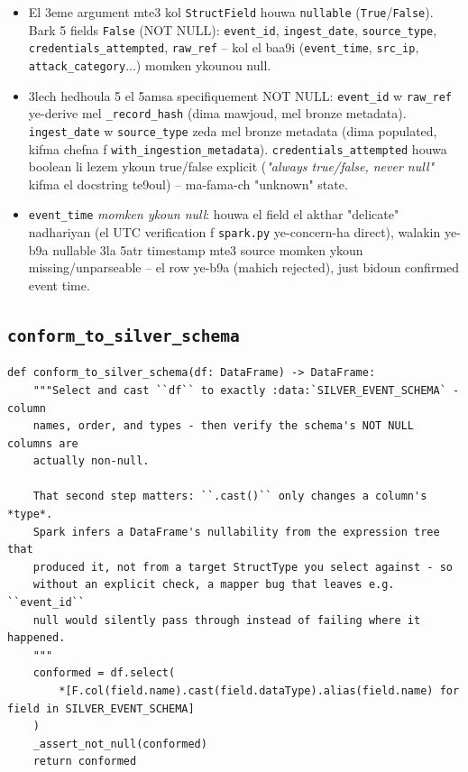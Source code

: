 \documentclass[11pt,a4paper]{report}
\DeclareRobustCommand{\code}[1]{\texttt{#1}}
\begin{document}
\begin{itemize}
  \item El 3eme argument mte3 kol \code{StructField} houwa \code{nullable}
        (\code{True}/\code{False}). Bark 5 fields \code{False} (NOT NULL):
        \code{event\_id}, \code{ingest\_date}, \code{source\_type},
        \code{credentials\_attempted}, \code{raw\_ref} -- kol el baa9i
        (\code{event\_time}, \code{src\_ip}, \code{attack\_category}...)
        momken ykounou null.
  \item 3lech hedhoula 5 el 5amsa specifiquement NOT NULL: \code{event\_id}
        w \code{raw\_ref} ye-derive mel \code{\_record\_hash} (dima mawjoud,
        mel bronze metadata). \code{ingest\_date} w \code{source\_type}
        zeda mel bronze metadata (dima populated, kifma chefna f
        \code{with\_ingestion\_metadata}). \code{credentials\_attempted}
        houwa boolean li lezem ykoun true/false explicit (\emph{"always
        true/false, never null"} kifma el docstring te9oul) -- ma-fama-ch
        "unknown" state.
  \item \code{event\_time} \emph{momken ykoun null}: houwa el field el
        akthar "delicate" nadhariyan (el UTC verification f \code{spark.py}
        ye-concern-ha direct), walakin ye-b9a nullable 3la 5atr timestamp
        mte3 source momken ykoun missing/unparseable -- el row ye-b9a
        (mahich rejected), just bidoun confirmed event time.
\end{itemize}

\subsection{\code{conform\_to\_silver\_schema}}

\begin{lstlisting}[style=pystyle]
def conform_to_silver_schema(df: DataFrame) -> DataFrame:
    """Select and cast ``df`` to exactly :data:`SILVER_EVENT_SCHEMA` - column
    names, order, and types - then verify the schema's NOT NULL columns are
    actually non-null.

    That second step matters: ``.cast()`` only changes a column's *type*.
    Spark infers a DataFrame's nullability from the expression tree that
    produced it, not from a target StructType you select against - so
    without an explicit check, a mapper bug that leaves e.g. ``event_id``
    null would silently pass through instead of failing where it happened.
    """
    conformed = df.select(
        *[F.col(field.name).cast(field.dataType).alias(field.name) for field in SILVER_EVENT_SCHEMA]
    )
    _assert_not_null(conformed)
    return conformed
\end{lstlisting}
\end{document}
